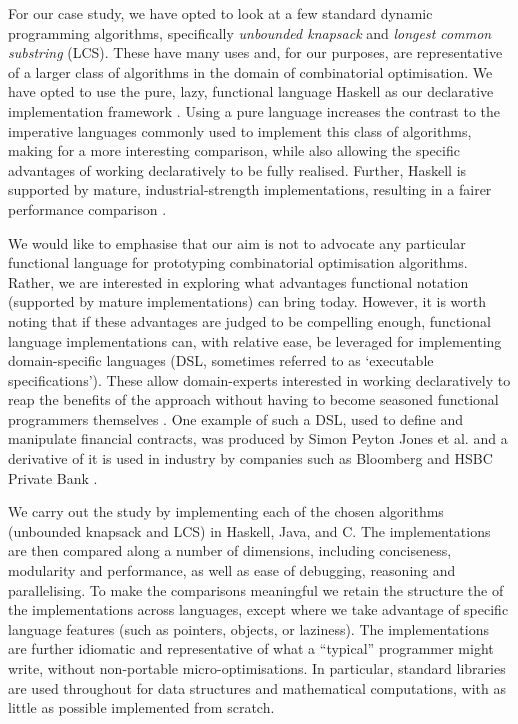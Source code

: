 For our case study, we have opted to look at a few standard dynamic
programming algorithms, specifically \emph{unbounded knapsack} and
\emph{longest common substring} (LCS). These have
many uses and, for our purposes, are
representative of a larger class of algorithms in the domain of combinatorial
optimisation. We have opted to
use the pure, lazy, functional language Haskell as our declarative implementation framework \cite{Haskell98Book}. Using a pure language increases the contrast to the imperative languages commonly used
to implement this class of algorithms, making for a more interesting
comparison, while also allowing the specific advantages of working
declaratively
to be fully realised. Further, Haskell is supported by mature,
industrial-strength implementations, resulting in a fairer performance
comparison \cite{ghc-llvm}.

We would like to emphasise that our aim is not to advocate any particular
functional language for prototyping combinatorial optimisation algorithms.
Rather, we are interested in exploring what advantages functional notation
(supported by mature implementations) can bring today. However, it is
worth noting that if these
advantages are judged to be compelling enough, functional
language implementations can, with relative ease, be leveraged for
implementing domain-specific languages (DSL, sometimes referred to as `executable specifications'). These allow domain-experts interested in
working declaratively to reap the benefits of the approach without having to
become seasoned functional programmers themselves \cite{Hudak1998}. One example
of such a DSL, used to define and manipulate financial contracts,
was produced by Simon Peyton Jones et al. and
a derivative of it is used in industry by companies such as Bloomberg
and HSBC Private Bank \cite{contracts}.

We carry out the study by implementing each of the chosen algorithms (unbounded
knapsack and LCS) in
Haskell, Java, and C. The implementations are then compared along a number
of dimensions, including conciseness, modularity and performance, as well as ease of debugging, reasoning and parallelising. To make the comparisons meaningful we retain the structure the
of the implementations across languages, except where we take advantage of
specific language features (such as pointers, objects, or laziness). The
implementations are further idiomatic and representative of what a
``typical'' programmer might write, without non-portable micro-optimisations.
In particular, standard libraries are used throughout for data structures and
mathematical computations, with as little as possible implemented from
scratch.


